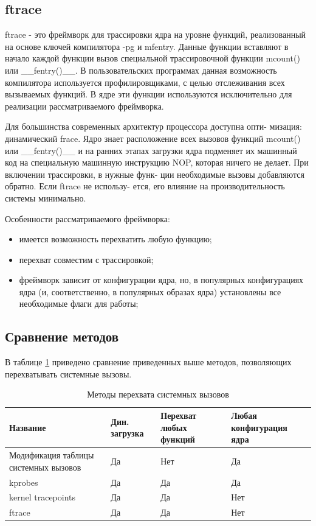 \subsection{ftrace}

ftrace - это фреймворк для трассировки ядра на уровне функций, реализованный на основе ключей компилятора -pg и mfentry.
Данные функции вставляют в начало каждой функции вызов специальной
трассировочной функции mcount() или \_\_fentry()\_\_. В пользовательских
программах данная возможность компилятора используется профилировщиками, с целью отслеживания всех вызываемых функций. В ядре эти
функции используются исключительно для реализации рассматриваемого
фреймворка.

Для большинства современных архитектур процессора доступна опти-
мизация: динамический frace.
Ядро знает расположение всех вызовов функций mcount() или \_\_fentry()\_\_ и на ранних этапах загрузки ядра
подменяет их машинный код на специальную машинную инструкцию NOP, которая ничего не делает. При включении трассировки, в нужные функ-
ции необходимые вызовы добавляются обратно. Если ftrace не использу-
ется, его влияние на производительность системы минимально.

Особенности рассматриваемого фреймворка:

\begin{itemize}
	\item имеется возможность перехватить любую функцию;
	\item перехват совместим с трассировкой;
	\item фреймворк зависит от конфигурации ядра, но, в популярных конфигурациях ядра (и, соответственно, в популярных образах ядра)
		установлены все необходимые флаги для работы;
\end{itemize}

\subsection*{Сравнение методов}

В таблице \ref{tab:analyze} приведено сравнение приведенных выше методов, позволяющих перехватывать системные вызовы.

\begin{table}[H]
	\centering
	\begin{tabular}{ | p{3cm} | p{2cm} | p{2cm} | p{2cm} | }
		\hline
		Название & Дин. загрузка & Перехват любых функций & Любая конфигурация ядра \\
		\hline
		Модификация таблицы системных вызовов & Да & Нет & Да \\
		\hline
		kprobes & Да & Да & Да\\
		\hline
		kernel tracepoints & Да & Да & Нет \\
		\hline
		ftrace & Да & Да & Нет \\
		\hline
	\end{tabular}
	\caption{\label{tab:analyze} Методы перехвата системных вызовов}
\end{table}

